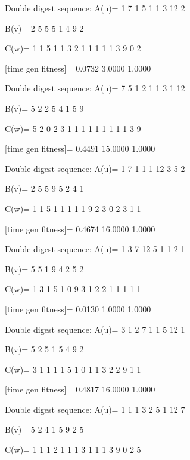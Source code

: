 Double digest sequence:
A(u)=
     1     7     1     5     1     1     3    12     2

B(v)=
     2     5     5     5     1     4     9     2

C(w)=
     1     1     5     1     1     3     2     1     1     1     1     1     3     9     0     2

[time gen fitness]=
    0.0732    3.0000    1.0000

Double digest sequence:
A(u)=
     7     5     1     2     1     1     3     1    12

B(v)=
     5     2     2     5     4     1     5     9

C(w)=
     5     2     0     2     3     1     1     1     1     1     1     1     1     1     3     9

[time gen fitness]=
    0.4491   15.0000    1.0000

Double digest sequence:
A(u)=
     1     7     1     1     1    12     3     5     2

B(v)=
     2     5     5     9     5     2     4     1

C(w)=
     1     1     5     1     1     1     1     1     9     2     3     0     2     3     1     1

[time gen fitness]=
    0.4674   16.0000    1.0000

Double digest sequence:
A(u)=
     1     3     7    12     5     1     1     2     1

B(v)=
     5     5     1     9     4     2     5     2

C(w)=
     1     3     1     5     1     0     9     3     1     2     2     1     1     1     1     1

[time gen fitness]=
    0.0130    1.0000    1.0000

Double digest sequence:
A(u)=
     3     1     2     7     1     1     5    12     1

B(v)=
     5     2     5     1     5     4     9     2

C(w)=
     3     1     1     1     1     5     1     0     1     1     3     2     2     9     1     1

[time gen fitness]=
    0.4817   16.0000    1.0000

Double digest sequence:
A(u)=
     1     1     1     3     2     5     1    12     7

B(v)=
     5     2     4     1     5     9     2     5

C(w)=
     1     1     1     2     1     1     1     3     1     1     1     3     9     0     2     5

